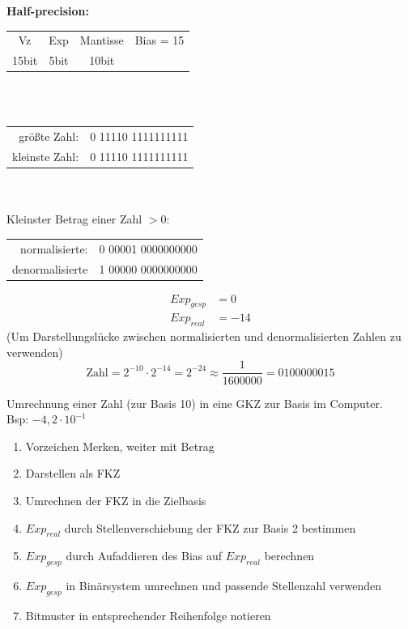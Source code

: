 \documentclass[10pt,a4paper]{scrartcl}
\begin{document}
\textbf{Half-precision:}\\
\begin{tabular}{cccc}
	
	Vz & Exp & Mantisse & Bias = 15\\
	15bit & 5bit & 10bit &
\end{tabular}
\\
\\
\begin{tabular}{rl}
	größte Zahl: & 0 11110 1111111111\\
kleinste Zahl:   & 0 11110 1111111111\\
\end{tabular}
\\
\\
Kleinster Betrag einer Zahl $ >0 $:\\
\begin{tabular}{rl}
	normalisierte: & 0 00001 0000000000\\
	denormalisierte & 1 00000 0000000000\\
\end{tabular}
\begin{align*}
Exp_{gesp} &= 0\\
Exp_{real} &= -14
\end{align*}
(Um Darstellungslücke zwischen normalisierten und denormalisierten Zahlen zu verwenden)
$$
\text{Zahl} = 2^{-10}\cdot 2^{-14} = 2^{-24} \approx \dfrac{1}{1600000} = 0100000015
$$

Umrechnung einer Zahl (zur Basis 10) in eine \ac{GKZ} zur Basis im Computer.\\
Bsp: $ -4,2 \cdot 10^{-1} $\\
\begin{enumerate}
	\item Vorzeichen Merken, weiter mit Betrag
	\item Darstellen als \ac{FKZ}
	\item Umrechnen der \ac{FKZ} in die Zielbasis
	\item $ Exp_{real} $ durch Stellenverschiebung der \ac{FKZ} zur Basis 2 bestimmen
	\item $ Exp_{gesp} $ durch Aufaddieren des Bias auf $ Exp_{real} $ berechnen
	\item $ Exp_{gesp} $ in Binärsystem umrechnen und passende Stellenzahl verwenden
	\item Bitmuster in entsprechender Reihenfolge notieren
\end{enumerate}
\end{document}
